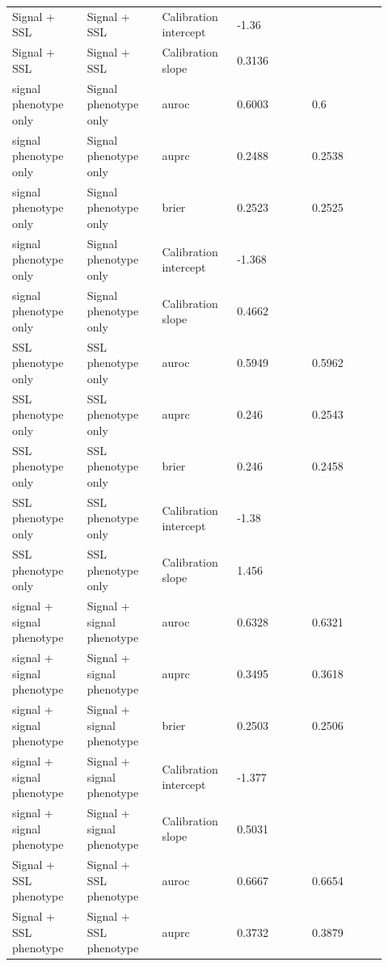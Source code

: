 \documentclass[11pt]{article}
\begin{document}
\begin{landscape}
\begin{longtable}{L{0.184\linewidth} L{0.184\linewidth} L{0.184\linewidth} L{0.184\linewidth} L{0.184\linewidth}}
Signal + SSL & Signal + SSL & Calibration intercept & -\allowbreak{}1.\allowbreak{}36 &  \\
Signal + SSL & Signal + SSL & Calibration slope & 0.\allowbreak{}3136 &  \\
signal phenotype only & Signal phenotype only & auroc & 0.\allowbreak{}6003 & 0.\allowbreak{}6 \\
signal phenotype only & Signal phenotype only & auprc & 0.\allowbreak{}2488 & 0.\allowbreak{}2538 \\
signal phenotype only & Signal phenotype only & brier & 0.\allowbreak{}2523 & 0.\allowbreak{}2525 \\
signal phenotype only & Signal phenotype only & Calibration intercept & -\allowbreak{}1.\allowbreak{}368 &  \\
signal phenotype only & Signal phenotype only & Calibration slope & 0.\allowbreak{}4662 &  \\
SSL phenotype only & SSL phenotype only & auroc & 0.\allowbreak{}5949 & 0.\allowbreak{}5962 \\
SSL phenotype only & SSL phenotype only & auprc & 0.\allowbreak{}246 & 0.\allowbreak{}2543 \\
SSL phenotype only & SSL phenotype only & brier & 0.\allowbreak{}246 & 0.\allowbreak{}2458 \\
SSL phenotype only & SSL phenotype only & Calibration intercept & -\allowbreak{}1.\allowbreak{}38 &  \\
SSL phenotype only & SSL phenotype only & Calibration slope & 1.\allowbreak{}456 &  \\
signal + signal phenotype & Signal + signal phenotype & auroc & 0.\allowbreak{}6328 & 0.\allowbreak{}6321 \\
signal + signal phenotype & Signal + signal phenotype & auprc & 0.\allowbreak{}3495 & 0.\allowbreak{}3618 \\
signal + signal phenotype & Signal + signal phenotype & brier & 0.\allowbreak{}2503 & 0.\allowbreak{}2506 \\
signal + signal phenotype & Signal + signal phenotype & Calibration intercept & -\allowbreak{}1.\allowbreak{}377 &  \\
signal + signal phenotype & Signal + signal phenotype & Calibration slope & 0.\allowbreak{}5031 &  \\
Signal + SSL phenotype & Signal + SSL phenotype & auroc & 0.\allowbreak{}6667 & 0.\allowbreak{}6654 \\
Signal + SSL phenotype & Signal + SSL phenotype & auprc & 0.\allowbreak{}3732 & 0.\allowbreak{}3879 \\

\end{longtable}
\end{landscape}
\end{document}
